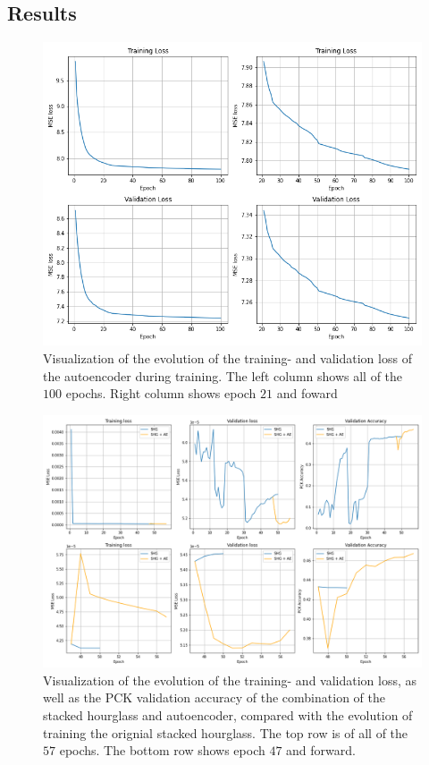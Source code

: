 \documentclass[./main.tex]{subfiles}
\begin{document}
\subsection{Results}
\begin{figure}[htbp]
    \centering
    \includegraphics[height = 10 cm]{entities/AE_evolution.png}
    \caption{Visualization of the evolution of the training- and validation loss of the autoencoder during training. The left column shows all of the $100$ epochs. Right column shows epoch $21$ and foward}
    \label{fig:AE_evolution}
\end{figure}
\begin{figure}[htb]
    \centering
    \includegraphics[width = \textwidth]{entities//SHG_AE_Evolution.png}
    \caption{Visualization of the evolution of the training- and validation loss, as well as the PCK validation accuracy of the combination of the stacked hourglass and autoencoder, compared with the evolution of training the orignial stacked hourglass. The top row is of all of the $57$ epochs. The bottom row shows epoch $47$ and forward.}
    \label{fig:SHG_AE_evolution}
\end{figure}
\end{document}
